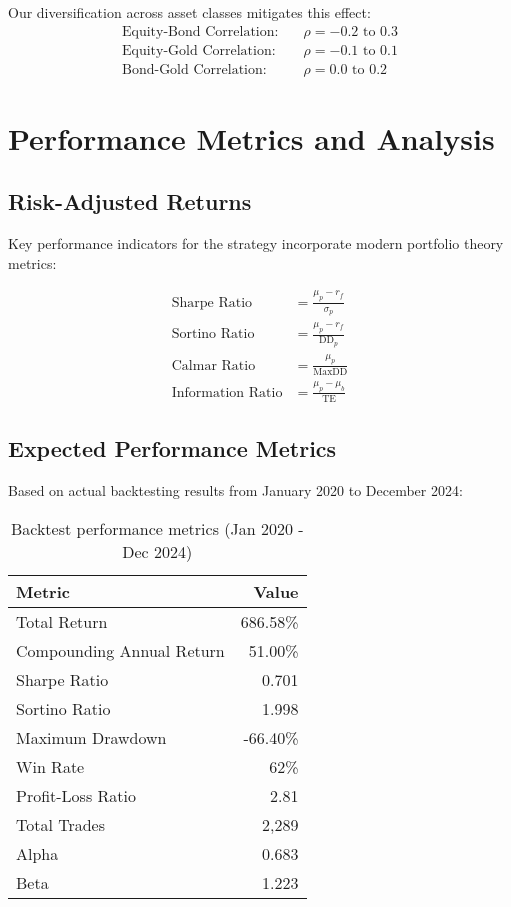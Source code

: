 \documentclass[onecolumn,11pt]{IEEEtran}
\begin{document}
Our diversification across asset classes mitigates this effect:
\begin{align}
\text{Equity-Bond Correlation:} &\quad \rho = -0.2 \text{ to } 0.3 \\
\text{Equity-Gold Correlation:} &\quad \rho = -0.1 \text{ to } 0.1 \\
\text{Bond-Gold Correlation:} &\quad \rho = 0.0 \text{ to } 0.2
\end{align}

\section{Performance Metrics and Analysis}

\subsection{Risk-Adjusted Returns}

Key performance indicators for the strategy incorporate modern portfolio theory metrics:

\begin{align}
\text{Sharpe Ratio} &= \frac{\mu_p - r_f}{\sigma_p} \\
\text{Sortino Ratio} &= \frac{\mu_p - r_f}{\text{DD}_p} \\
\text{Calmar Ratio} &= \frac{\mu_p}{\text{MaxDD}} \\
\text{Information Ratio} &= \frac{\mu_p - \mu_b}{\text{TE}}
\end{align}

\subsection{Expected Performance Metrics}

Based on actual backtesting results from January 2020 to December 2024:

\begin{table}[h]
\centering
\begin{tabular}{lr}
\toprule
\textbf{Metric} & \textbf{Value} \\
\midrule
Total Return & 686.58\% \\
Compounding Annual Return & 51.00\% \\
Sharpe Ratio & 0.701 \\
Sortino Ratio & 1.998 \\
Maximum Drawdown & -66.40\% \\
Win Rate & 62\% \\
Profit-Loss Ratio & 2.81 \\
Total Trades & 2,289 \\
Alpha & 0.683 \\
Beta & 1.223 \\
\bottomrule
\end{tabular}
\caption{Backtest performance metrics (Jan 2020 - Dec 2024)}
\end{table}
\end{document}
